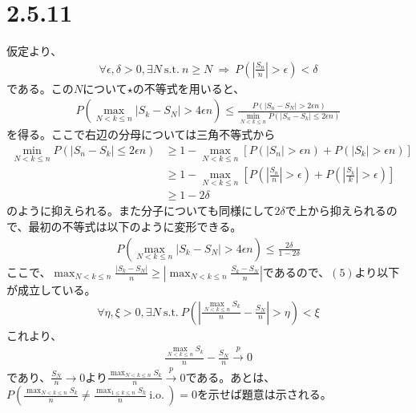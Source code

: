 \documentclass{article}
\begin{document}
\section{2.5.11}
仮定より、
\begin{align*}
	\forall \epsilon, \delta > 0, \exists N\ \text{s.t.}\ n\geq N\ \Rightarrow\  P\left( \left| \frac{S_n}{n} \right| > \epsilon \right) < \delta
\end{align*}
である。この$N$について$\star$の不等式を用いると、
\begin{align*}
	P\left( \max_{N<k\leq n} \left|S_k - S_N\right| > 4\epsilon n \right) \leq\frac{P\left( \left| S_n -S_N \right| > 2\epsilon n \right)}{\min_{N<k \leq n}P\left( \left| S_n - S_k \right| \leq 2\epsilon n \right)}
\end{align*}
を得る。ここで右辺の分母については三角不等式から
\begin{align*}
	\min_{N<k \leq n}P\left( \left| S_n - S_k \right| \leq 2\epsilon n \right) &\geq 1 - \max_{N<k \leq n} \left[ P\left( \left| S_n \right| > \epsilon n \right) + P\left( \left| S_k \right| > \epsilon n \right) \right]\\[10pt]
	&\geq 1- \max_{N<k \leq n} \left[ P\left( \left| \frac{S_n}{n} \right| > \epsilon \right) + P\left( \left| \frac{S_k}{k} \right| > \epsilon \right) \right]\\[10pt]
	&\geq 1 - 2 \delta
\end{align*}
のように抑えられる。また分子についても同様にして$2\delta$で上から抑えられるので、最初の不等式は以下のように変形できる。
\begin{align}
	P\left( \max_{N<k\leq n} \left|S_k - S_N\right| > 4\epsilon n \right) \leq \frac{2\delta}{1 - 2\delta}
\end{align}
ここで、$\max_{N<k\leq n} \frac{\left| S_k - S_N \right|}{n} \geq \left| \max_{N<k\leq n} \frac{S_k - S_N}{n} \right|$であるので、$(5)$より以下が成立している。
\begin{align*}
	\forall \eta, \xi > 0, \exists N\ \text{s.t.}\ P\left( \left| \frac{\max_{N<k\leq n} S_k}{n} - \frac{S_N}{n} \right| > \eta \right) < \xi
\end{align*}
これより、
\begin{align*}
	 \frac{\max_{N<k\leq n} S_k}{n} - \frac{S_N}{n} \xrightarrow{p} 0
\end{align*}
であり、$\frac{S_N}{n} \to 0$より$\frac{\max_{N<k\leq n} S_k}{n} \xrightarrow{p} 0$である。あとは、$P\left( \frac{\max_{N<k\leq n} S_k}{n} \neq \frac{\max_{1\leq k\leq n} S_k}{n}\ \text{i.o.}\ \right) = 0$を示せば題意は示される。
\end{document}
